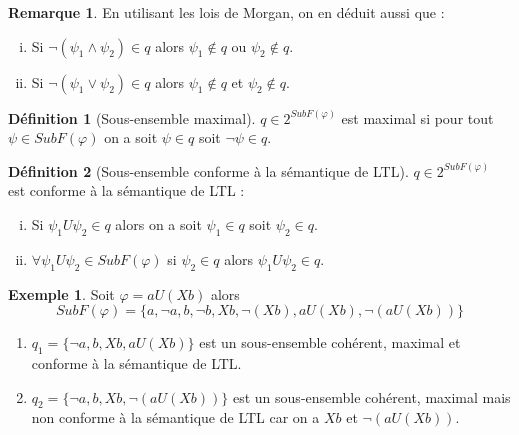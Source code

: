 \documentclass[12pt,a4paper]{article}
\theoremstyle{plain}
\theoremstyle{definition}
\newtheorem{defi}{Définition}
\newtheorem{rmq}{Remarque}
\newtheorem{ex}{Exemple}
\begin{document}
\begin{rmq}
  En utilisant les lois de Morgan, on en déduit aussi que :
  \begin{enumerate}[(i)]
  \item Si $\lnot (\psi_1 \land \psi_2) \in q$ alors $\psi_1 \not \in q$ ou $\psi_2 \not \in q$.
  \item Si $\lnot (\psi_1 \lor \psi_2) \in q$ alors $\psi_1 \not \in q$ et $\psi_2 \not \in q$.
  \end{enumerate}
\end{rmq}


\begin{defi}[Sous-ensemble maximal]
  $q \in 2^{SubF(\varphi)}$ est maximal si pour tout $\psi \in SubF(\varphi)$ on a soit $\psi \in q$ soit $\lnot \psi \in q$.  
\end{defi}

\begin{defi}[Sous-ensemble conforme à la sémantique de LTL]
  \label{ss-ens-ok-ltl}
  $q \in 2^{SubF(\varphi)}$ est conforme à la sémantique de LTL :
  \begin{enumerate}[(i)]
  \item Si $\psi_1 U \psi_2 \in q$ alors on a soit $\psi_1 \in q$ soit $\psi_2 \in q$.
  \item $\forall \psi_1 U \psi_2 \in SubF(\varphi)$ si $\psi_2 \in q$ alors $\psi_1 U \psi_2 \in q$.
  \end{enumerate}
\end{defi}

\begin{ex}
  Soit $\varphi = a U (Xb)$ alors
  \[
    SubF(\varphi) = \{a, \lnot a, b, \lnot b, Xb, \lnot (Xb), a U (Xb), \lnot (aU(Xb))\}
  \]
  \begin{enumerate}
  \item $q_1 = \{\lnot a, b, Xb, a U (Xb)\}$ est un sous-ensemble cohérent, maximal et conforme à la sémantique de LTL.
  \item $q_2 = \{\lnot a, b, Xb, \lnot(a U (Xb))\}$ est un sous-ensemble cohérent, maximal mais non conforme à la sémantique de LTL
    car on a $Xb$ et $\lnot(a U (Xb))$.
  \end{enumerate}
\end{ex}
\end{document}
